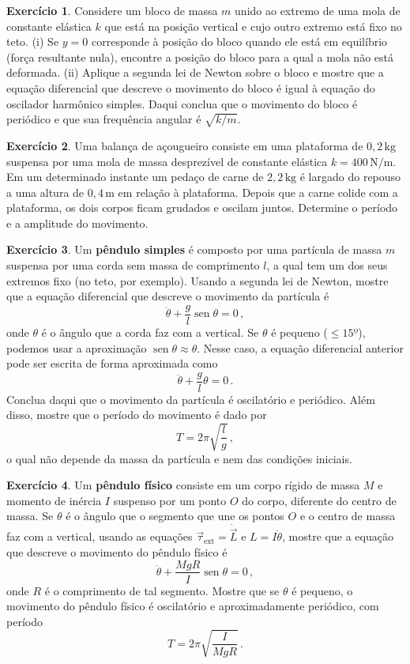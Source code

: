 \documentclass[twocolumn=on,fontsize=12pt,DIV=calc]{scrartcl}
\theoremstyle{definition}
\newtheorem{ex}{Exercício}[section]
\DeclareMathOperator{\sen}{sen}
\begin{document}
\begin{ex}
  Considere um bloco de massa $m$ unido ao extremo de uma mola de
  constante elástica $k$ que está na posição vertical e cujo outro
  extremo está fixo no teto. (i) Se $y=0$ corresponde à posição do
  bloco quando ele está em equilíbrio (força resultante nula),
  encontre a posição do bloco para a qual a mola não está
  deformada. (ii) Aplique a segunda lei de Newton sobre o bloco e
  mostre que a equação diferencial que descreve o movimento do bloco é
  igual à equação do oscilador harmônico simples. Daqui conclua que o
  movimento do bloco é periódico e que sua frequência angular é
  $\sqrt{k/m}$.
\end{ex}

\begin{ex}
  Uma balança de açougueiro consiste em uma plataforma de
  $0{,}2\,\mathrm{kg}$ suspensa por uma mola de massa desprezível de
  constante elástica $k=400\,\mathrm{N/m}$. Em um determinado instante
  um pedaço de carne de $2{,}2\,\mathrm{kg}$ é largado do repouso a
  uma altura de $0{,}4\,\mathrm{m}$ em relação à plataforma. Depois
  que a carne colide com a plataforma, os dois corpos ficam grudados e
  oscilam juntos. Determine o período e a amplitude do movimento.
\end{ex}

\begin{ex}
  Um \textbf{pêndulo simples} é composto por uma partícula de massa
  $m$ suspensa por uma corda sem massa de comprimento $l$, a qual tem
  um dos seus extremos fixo (no teto, por exemplo). Usando a segunda
  lei de Newton, mostre que a equação diferencial que descreve o
  movimento da partícula é
  $$\ddot\theta+\frac{g}{l}\sen\theta=0\,,$$
  onde $\theta$ é o ângulo que a corda faz com a vertical. Se $\theta$
  é pequeno ($\le 15º$), podemos usar a aproximação
  $\sen\theta\approx \theta$. Nesse caso, a equação diferencial
  anterior pode ser escrita de forma aproximada como
  $$\ddot\theta+\frac{g}{l}\theta=0\,.$$
  Conclua daqui que o movimento da partícula é oscilatório e
  periódico. Além disso, mostre que o período do movimento é dado por
  $$T=2\pi\sqrt{\frac{l}{g}}\,,$$
  o qual não depende da massa da partícula e nem das condições
  iniciais.
\end{ex}

\begin{ex}
  Um \textbf{pêndulo físico} consiste em um corpo rígido de massa $M$
  e momento de inércia $I$ suspenso por um ponto $O$ do corpo,
  diferente do centro de massa. Se $\theta$ é o ângulo que o segmento
  que une os pontos $O$ e o centro de massa faz com a vertical, usando
  as equações $\vec\tau_\mathrm{ext}=\dot{\vec L}$ e $L=I\dot\theta$,
  mostre que a equação que descreve o movimento do pêndulo físico é
  $$\ddot\theta+\frac{MgR}{I}\sen\theta=0\,,$$
  onde $R$ é o comprimento de tal segmento. Mostre que se $\theta$ é
  pequeno, o movimento do pêndulo físico é oscilatório e
  aproximadamente periódico, com período
  $$T=2\pi\sqrt{\frac{I}{MgR}}\,.$$
\end{ex}
\end{document}
